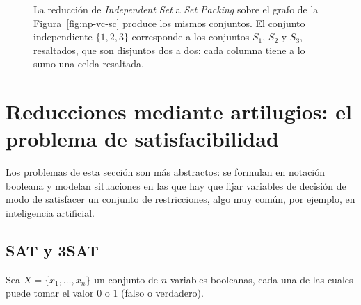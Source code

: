 \documentclass[12pt, spanish, oneside, openany]{book}
\newcommand{\prob}[1]{\textit{#1}}
\newcommand{\IS}{\prob{Independent Set}\xspace}
\newcommand{\SP}{\prob{Set Packing}\xspace}
\theoremstyle{uprightplain}
\theoremstyle{definition}
\theoremstyle{remark}
\theoremstyle{definition}
\begin{document}
\begin{figure}[H]
\centering
{}
\caption{La reducción de \IS a \SP sobre el grafo de la Figura~\ref{fig:np-vc-sc}
produce los mismos conjuntos. El conjunto independiente $\{1,2,3\}$ corresponde a
los conjuntos $S_1$, $S_2$ y $S_3$, resaltados, que son disjuntos dos a dos: cada
columna tiene a lo sumo una celda resaltada.}
\label{fig:np-is-sp}
\end{figure}


\section{Reducciones mediante artilugios: el problema de satisfacibilidad}
\label{sec:np-sat}

Los problemas de esta sección son más abstractos: se formulan en notación booleana y modelan situaciones en las que hay que fijar variables de decisión de modo de satisfacer un conjunto de restricciones, algo muy común, por ejemplo, en inteligencia artificial.

\subsection{SAT y 3SAT}

Sea $X=\{x_1,\dots,x_n\}$ un conjunto de $n$ variables booleanas, cada una de las cuales puede tomar el valor $0$ o $1$ (falso o verdadero).
\end{document}
